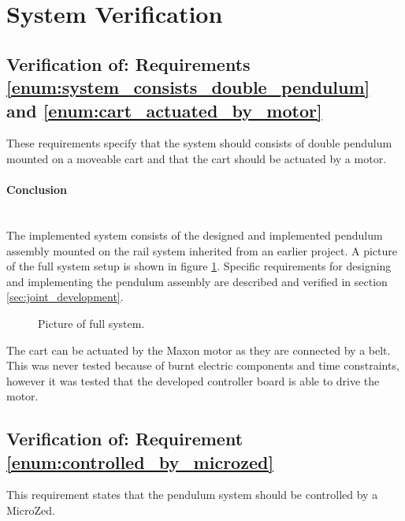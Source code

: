 \section{System Verification}
\label{sec:system_verification}

\subsection{Verification of: Requirements \ref{enum:system_consists_double_pendulum} and \ref{enum:cart_actuated_by_motor}} %
\label{sub:verification_of_requirement_enum:system_consists_double_pendulum}
These requirements specify that the system should consists of double pendulum mounted on a moveable cart and that the cart should be actuated by a motor.

\paragraph{Conclusion}~\\
The implemented system consists of the designed and implemented pendulum assembly mounted on the rail system inherited from an earlier project.
A picture of the full system setup is shown in figure \ref{fig:pic_full_system}.
Specific requirements for designing and implementing the pendulum assembly are described and verified in section \ref{sec:joint_development}.
\begin{figure}
	\centering
	\caption{Picture of full system.}
	\label{fig:pic_full_system}
\end{figure}
The cart can be actuated by the Maxon motor as they are connected by a belt. 
This was never tested because of burnt electric components and time constraints, however it was tested that the developed controller board is able to drive the motor.



\subsection{Verification of: Requirement \ref{enum:controlled_by_microzed}} %
\label{sub:verification_of_requirement_enum:controlled_by_microzed}
This requirement states that the pendulum system should be controlled by a MicroZed.

